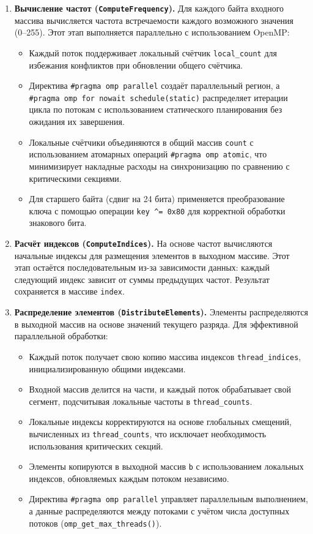 \documentclass[12pt]{article}
\begin{document}
\begin{enumerate}
  \item \textbf{Вычисление частот (\texttt{ComputeFrequency}).} 
  Для каждого байта входного массива вычисляется частота встречаемости каждого возможного значения (0--255). Этот этап выполняется параллельно с использованием OpenMP:
  \begin{itemize}
    \item Каждый поток поддерживает локальный счётчик \texttt{local\_count} для избежания конфликтов при обновлении общего счётчика.
    \item Директива \texttt{\#pragma omp parallel} создаёт параллельный регион, а \texttt{\#pragma omp for nowait schedule(static)} распределяет итерации цикла по потокам с использованием статического планирования без ожидания их завершения.
    \item Локальные счётчики объединяются в общий массив \texttt{count} с использованием атомарных операций \texttt{\#pragma omp atomic}, что минимизирует накладные расходы на синхронизацию по сравнению с критическими секциями.
    \item Для старшего байта (сдвиг на 24 бита) применяется преобразование ключа с помощью операции \verb|key ^= 0x80| для корректной обработки знакового бита.
  \end{itemize}

  \item \textbf{Расчёт индексов (\texttt{ComputeIndices}).}
  На основе частот вычисляются начальные индексы для размещения элементов в выходном массиве. Этот этап остаётся последовательным из-за зависимости данных: каждый следующий индекс зависит от суммы предыдущих частот. Результат сохраняется в массиве \texttt{index}.

  \item \textbf{Распределение элементов (\texttt{DistributeElements}).}
  Элементы распределяются в выходной массив на основе значений текущего разряда. Для эффективной параллельной обработки:
  \begin{itemize}
    \item Каждый поток получает свою копию массива индексов \texttt{thread\_indices}, инициализированную общими индексами.
    \item Входной массив делится на части, и каждый поток обрабатывает свой сегмент, подсчитывая локальные частоты в \texttt{thread\_counts}.
    \item Локальные индексы корректируются на основе глобальных смещений, вычисленных из \texttt{thread\_counts}, что исключает необходимость использования критических секций.
    \item Элементы копируются в выходной массив \texttt{b} с использованием локальных индексов, обновляемых каждым потоком независимо.
    \item Директива \texttt{\#pragma omp parallel} управляет параллельным выполнением, а данные распределяются между потоками с учётом числа доступных потоков (\texttt{omp\_get\_max\_threads()}).
  \end{itemize}


\end{enumerate}
\end{document}
